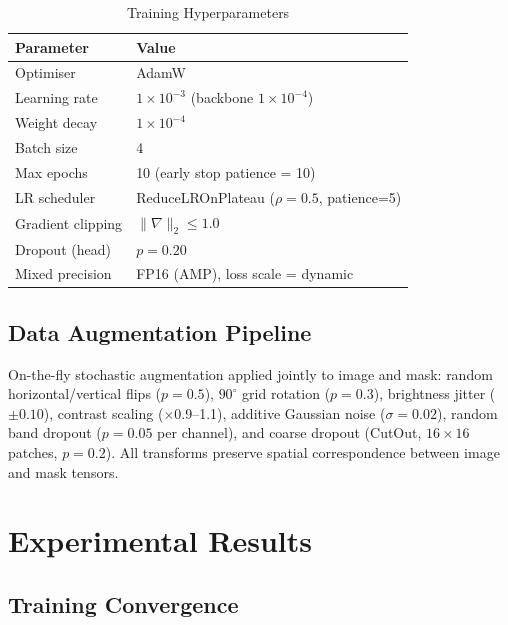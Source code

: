 \documentclass[10pt,conference]{IEEEtran}
\begin{document}
\begin{table}[!t]
  \caption{Training Hyperparameters}
  \label{tab:hyperparams}
  \centering
  \small
  \begin{tabular}{l l}
    \toprule
    \textbf{Parameter} & \textbf{Value} \\
    \midrule
    Optimiser          & AdamW \\
    Learning rate      & $1\!\times\!10^{-3}$ (backbone $1\!\times\!10^{-4}$) \\
    Weight decay       & $1\!\times\!10^{-4}$ \\
    Batch size         & 4 \\
    Max epochs         & 10 (early stop patience = 10) \\
    LR scheduler       & ReduceLROnPlateau ($\rho=0.5$, patience=5) \\
    Gradient clipping  & $\|\nabla\|_2 \le 1.0$ \\
    Dropout (head)     & $p = 0.20$ \\
    Mixed precision    & FP16 (AMP), loss scale = dynamic \\
    \bottomrule
  \end{tabular}
\end{table}

\subsection{Data Augmentation Pipeline}

On-the-fly stochastic augmentation applied jointly to image and mask:
random horizontal/vertical flips ($p{=}0.5$), $90^\circ$ grid rotation
($p{=}0.3$), brightness jitter ($\pm0.10$), contrast scaling
($\times$0.9--1.1), additive Gaussian noise ($\sigma{=}0.02$),
random band dropout ($p{=}0.05$ per channel), and coarse dropout (CutOut,
$16{\times}16$ patches, $p{=}0.2$). All transforms preserve spatial
correspondence between image and mask tensors.

\section{Experimental Results}
\label{sec:results}

\subsection{Training Convergence}
\end{document}
